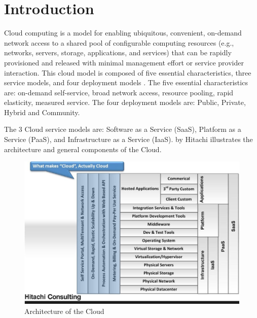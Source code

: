 \chapter{Introduction}
\label{cha:intro}
Cloud computing is a model for enabling ubiquitous, convenient, on-demand network access to a shared pool of configurable computing resources (e.g., networks, servers, storage, applications, and services) that can be rapidly provisioned and released with minimal management effort or service provider interaction. This cloud model is composed of five essential characteristics, three service models, and four deployment models \cite{NIST}. The five essential characteristics are: on-demand self-service, broad network access, resource pooling, rapid elasticity, measured service. The four deployment models are: Public, Private, Hybrid and Community.

The 3 Cloud service models are: Software as
a Service (SaaS), Platform as a Service (PaaS), and
Infrastructure as a Service (IaaS). 
 by Hitachi illustrates the architecture and general components of the Cloud.

\begin{figure}[ht]
  \includegraphics[width=\textwidth]{Figures/intro/Hitachi_3Layers.jpg}
  \caption{Architecture of the Cloud}
  \label{fig:ArchitectureOfCloud}
\end{figure}


